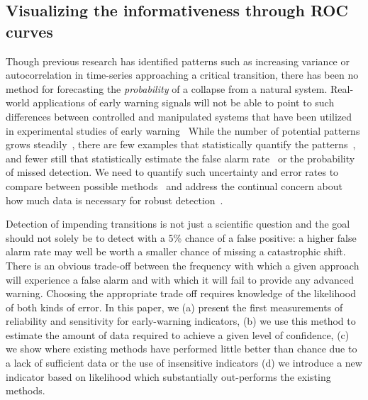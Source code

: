 \documentclass[authoryear,preprint,11pt]{elsarticle}
\begin{document}
\citet{Seekell2011}

\subsection{Visualizing the informativeness through ROC curves}


Though previous research has identified patterns such as increasing variance or autocorrelation
in time-series approaching a critical transition,
there has been no method for forecasting the \emph{probability} of a collapse from a natural system.
Real-world applications of early warning signals will not be able to point to such differences between controlled and
manipulated systems that have been utilized in experimental studies of early warning~\citep{Drake2010, Carpenter2011}⁠
While the number of potential patterns grows steadily~\citep{Carpenter2006, Dakos2008, Guttal2008, Guttal2008a, Dakos2011}, %
there are few examples that statistically quantify the patterns~\citep{Dakos2008, Dakos2011},⁠
and fewer still that statistically estimate the false alarm rate~\citep{Dakos2008} or 
the probability of missed detection⁠. 
We need to quantify such uncertainty and error rates to compare between possible methods~\citep{Contamin2009}
and address the continual concern about how much data is necessary⁠ for robust detection~\citep{Scheffer2001, Dakos2008, Carpenter2011, Scheffer2010, Inman2011}.  

Detection of impending transitions is not just a scientific question 
and the goal should not solely be to detect with a 5\% chance of a false positive:
a higher false alarm rate may well be  worth a smaller chance of  missing a catastrophic shift. 
There is an obvious trade-off between the frequency with which a given approach will experience a false alarm and
with which it will fail to provide any advanced warning. 
Choosing the appropriate trade off requires knowledge of the likelihood of both kinds of error.
In this paper, we
(a) present the first measurements of reliability and sensitivity for early-warning indicators, 
(b) we use this method to estimate the amount of data required to achieve a given level of confidence,  
(c) we show where existing methods have performed little better than chance due to a lack of sufficient data or the use of insensitive indicators 
(d) we introduce a new indicator based on likelihood which substantially out-performs the existing methods.     
\end{document}
